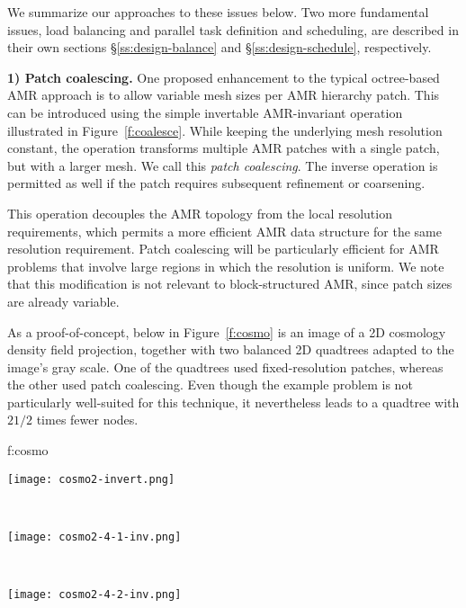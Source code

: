 \documentclass[10pt]{article}
\begin{document}
We summarize our approaches to these issues below.  Two more
fundamental issues, load balancing and parallel task definition and
scheduling, are described in their own sections
\S\ref{ss:design-balance} and \S\ref{ss:design-schedule},
respectively.


\textbf{1) Patch coalescing.} One proposed enhancement to the typical
octree-based AMR approach is to allow variable mesh sizes per AMR
hierarchy patch.  This can be introduced using the simple invertable
AMR-invariant operation illustrated in Figure~\ref{f:coalesce}.  While
keeping the underlying mesh resolution constant, the operation
transforms multiple AMR patches with a single patch, but with a larger
mesh.  We call this \textit{patch coalescing}.  The inverse operation
is permitted as well if the patch requires subsequent refinement or
coarsening.



This operation decouples the AMR topology from the local resolution
requirements, which permits a more efficient AMR data structure for
the same resolution requirement.  Patch coalescing will be
particularly efficient for AMR problems that involve large regions
in which the resolution is uniform.  We note that this modification
is not relevant to block-structured AMR, since patch sizes are already
variable.

As a proof-of-concept, below in Figure~\ref{f:cosmo} is an image of a
2D cosmology density field projection, together with two balanced 2D
quadtrees adapted to the image's gray scale.  One of the quadtrees
used fixed-resolution patches, whereas the other used patch
coalescing.  Even though the example problem is not particularly
well-suited for this technique, it nevertheless leads to a quadtree
with $2 1/2$ times fewer nodes.

 {f:cosmo}{
\begin{minipage}{7.0in}
\begin{minipage}{2.2in}
\texttt{[image: cosmo2-invert.png]}
\end{minipage} \ 
\begin{minipage}{2.2in}
\texttt{[image: cosmo2-4-1-inv.png]}
\end{minipage} \ 
\begin{minipage}{2.2in}
\texttt{[image: cosmo2-4-2-inv.png]}
\end{minipage}
\end{minipage}
}
\end{document}

